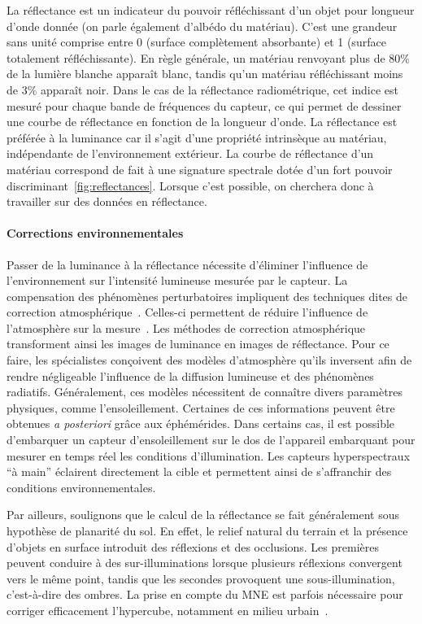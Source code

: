 La réflectance est un indicateur du pouvoir réfléchissant d'un objet pour longueur d'onde donnée (on parle également d'albédo du matériau). C'est une grandeur sans unité comprise entre 0 (surface complètement absorbante) et 1 (surface totalement réfléchissante). En règle générale, un matériau renvoyant plus de 80\% de la lumière blanche apparaît blanc, tandis qu'un matériau réfléchissant moins de 3\% apparaît noir. Dans le cas de la réflectance radiométrique, cet indice est mesuré pour chaque bande de fréquences du capteur, ce qui permet de dessiner une courbe de réflectance en fonction de la longueur d'onde. La réflectance est préférée à la luminance car il s'agit d'une propriété intrinsèque au matériau, indépendante de l'environnement extérieur. La courbe de réflectance d'un matériau correspond de fait à une signature spectrale dotée d'un fort pouvoir discriminant~\cref{fig:reflectances}. Lorsque c'est possible, on cherchera donc à travailler sur des données en réflectance.

\paragraph{Corrections environnementales}
Passer de la luminance à la réflectance nécessite d'éliminer l'influence de l'environnement sur l'intensité lumineuse mesurée par le capteur. La compensation des phénomènes perturbatoires impliquent des techniques dites de correction atmosphérique~\cite{deschamps_atmospheric_1980, rahman_smac_1994, chavez_image-based_1996}. Celles-ci permettent de réduire l'influence de l'atmosphère sur la mesure~\cite{gao_atmospheric_2009}. Les méthodes de correction atmosphérique transforment ainsi les images de luminance en images de réflectance. Pour ce faire, les spécialistes conçoivent des modèles d'atmosphère qu'ils inversent afin de rendre négligeable l'influence de la diffusion lumineuse et des phénomènes radiatifs. Généralement, ces modèles nécessitent de connaître divers paramètres physiques, comme l'ensoleillement. Certaines de ces informations peuvent être obtenues \emph{a posteriori} grâce aux éphémérides. Dans certains cas, il est possible d'embarquer un capteur d'ensoleillement sur le dos de l'appareil embarquant pour mesurer en temps réel les conditions d'illumination. Les capteurs hyperspectraux ``à main'' éclairent directement la cible et permettent ainsi de s'affranchir des conditions environnementales.

Par ailleurs, soulignons que le calcul de la réflectance se fait généralement sous hypothèse de planarité du sol. En effet, le relief natural du terrain et la présence d'objets en surface introduit des réflexions et des occlusions. Les premières peuvent conduire à des sur-illuminations lorsque plusieurs réflexions convergent vers le même point, tandis que les secondes provoquent une sous-illumination, c'est-à-dire des ombres. La prise en compte du \gls{MNE} est parfois nécessaire pour corriger efficacement l'hypercube, notamment en milieu urbain~\cite{ceamanos_using_2017}.

